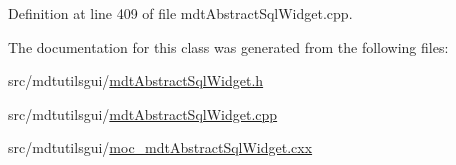 Definition at line 409 of file mdt\-Abstract\-Sql\-Widget.\-cpp.



The documentation for this class was generated from the following files\-:\begin{DoxyCompactItemize}
\item 
src/mdtutilsgui/\hyperlink{mdt_abstract_sql_widget_8h}{mdt\-Abstract\-Sql\-Widget.\-h}\item 
src/mdtutilsgui/\hyperlink{mdt_abstract_sql_widget_8cpp}{mdt\-Abstract\-Sql\-Widget.\-cpp}\item 
src/mdtutilsgui/\hyperlink{moc__mdt_abstract_sql_widget_8cxx}{moc\-\_\-mdt\-Abstract\-Sql\-Widget.\-cxx}\end{DoxyCompactItemize}
